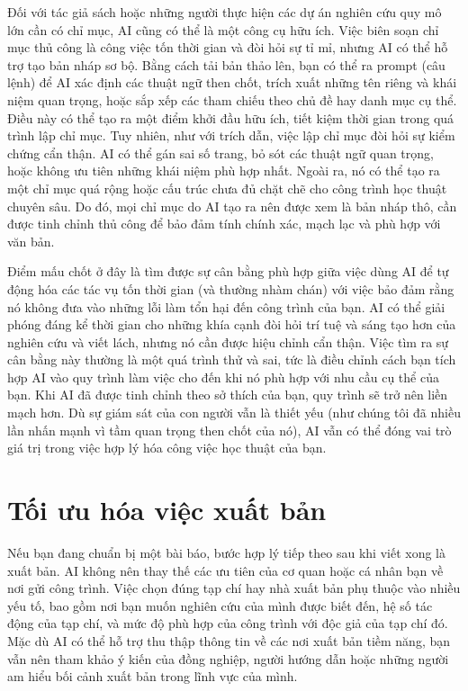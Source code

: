 Đối với tác giả sách hoặc những người thực hiện các dự án nghiên cứu quy mô lớn cần có chỉ mục, AI cũng có thể là một công cụ hữu ích. Việc biên soạn chỉ mục thủ công là công việc tốn thời gian và đòi hỏi sự tỉ mỉ, nhưng AI có thể hỗ trợ tạo bản nháp sơ bộ. Bằng cách tải bản thảo lên, bạn có thể ra prompt (câu lệnh) để AI xác định các thuật ngữ then chốt, trích xuất những tên riêng và khái niệm quan trọng, hoặc sắp xếp các tham chiếu theo chủ đề hay danh mục cụ thể. Điều này có thể tạo ra một điểm khởi đầu hữu ích, tiết kiệm thời gian trong quá trình lập chỉ mục. Tuy nhiên, như với trích dẫn, việc lập chỉ mục đòi hỏi sự kiểm chứng cẩn thận. AI có thể gán sai số trang, bỏ sót các thuật ngữ quan trọng, hoặc không ưu tiên những khái niệm phù hợp nhất. Ngoài ra, nó có thể tạo ra một chỉ mục quá rộng hoặc cấu trúc chưa đủ chặt chẽ cho công trình học thuật chuyên sâu. Do đó, mọi chỉ mục do AI tạo ra nên được xem là bản nháp thô, cần được tinh chỉnh thủ công để bảo đảm tính chính xác, mạch lạc và phù hợp với văn bản.

Điểm mấu chốt ở đây là tìm được sự cân bằng phù hợp giữa việc dùng AI để tự động hóa các tác vụ tốn thời gian (và thường nhàm chán) với việc bảo đảm rằng nó không đưa vào những lỗi làm tổn hại đến công trình của bạn. AI có thể giải phóng đáng kể thời gian cho những khía cạnh đòi hỏi trí tuệ và sáng tạo hơn của nghiên cứu và viết lách, nhưng nó cần được hiệu chỉnh cẩn thận. Việc tìm ra sự cân bằng này thường là một quá trình thử và sai, tức là điều chỉnh cách bạn tích hợp AI vào quy trình làm việc cho đến khi nó phù hợp với nhu cầu cụ thể của bạn. Khi AI đã được tinh chỉnh theo sở thích của bạn, quy trình sẽ trở nên liền mạch hơn. Dù sự giám sát của con người vẫn là thiết yếu (như chúng tôi đã nhiều lần nhấn mạnh vì tầm quan trọng then chốt của nó), AI vẫn có thể đóng vai trò giá trị trong việc hợp lý hóa công việc học thuật của bạn.

\section{Tối ưu hóa việc xuất bản}

Nếu bạn đang chuẩn bị một bài báo, bước hợp lý tiếp theo sau khi viết xong là xuất bản. AI không nên thay thế các ưu tiên của cơ quan hoặc cá nhân bạn về nơi gửi công trình. Việc chọn đúng tạp chí hay nhà xuất bản phụ thuộc vào nhiều yếu tố, bao gồm nơi bạn muốn nghiên cứu của mình được biết đến, hệ số tác động của tạp chí, và mức độ phù hợp của công trình với độc giả của tạp chí đó. Mặc dù AI có thể hỗ trợ thu thập thông tin về các nơi xuất bản tiềm năng, bạn vẫn nên tham khảo ý kiến của đồng nghiệp, người hướng dẫn hoặc những người am hiểu bối cảnh xuất bản trong lĩnh vực của mình.

